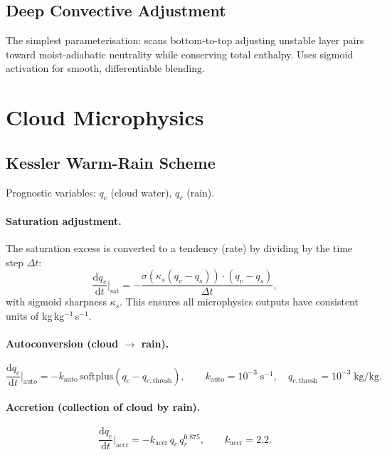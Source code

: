 \documentclass[11pt,twoside]{report}
\newcommand{\dd}{\mathrm{d}}
\begin{document}
\subsection{Deep Convective Adjustment}

The simplest parameterisation: scans bottom-to-top adjusting unstable
layer pairs toward moist-adiabatic neutrality while conserving total
enthalpy.  Uses sigmoid activation for smooth, differentiable blending.


\section{Cloud Microphysics}
\label{sec:microphysics}

\subsection{Kessler Warm-Rain Scheme}

Prognostic variables: $q_c$ (cloud water), $q_r$ (rain).

\paragraph{Saturation adjustment.}
The saturation excess is converted to a tendency (rate) by dividing by the
time step $\Delta t$:
\begin{equation}
  \frac{\dd q_v}{\dd t}\bigg|_{\mathrm{sat}}
  = -\frac{\sigma(\kappa_s(q_v-q_s))\cdot(q_v-q_s)}{\Delta t},
\end{equation}
with sigmoid sharpness $\kappa_s$.  This ensures all microphysics outputs
have consistent units of kg\,kg$^{-1}$\,s$^{-1}$.

\paragraph{Autoconversion (cloud $\to$ rain).}
\begin{equation}
  \frac{\dd q_c}{\dd t}\bigg|_{\mathrm{auto}}
  = -k_{\mathrm{auto}}\,\mathrm{softplus}(q_c - q_{c,\mathrm{thresh}}),
  \qquad k_{\mathrm{auto}}=10^{-3}\;\text{s}^{-1},\quad
  q_{c,\mathrm{thresh}}=10^{-3}\;\text{kg/kg}.
\end{equation}

\paragraph{Accretion (collection of cloud by rain).}
\begin{equation}
  \frac{\dd q_c}{\dd t}\bigg|_{\mathrm{accr}}
  = -k_{\mathrm{accr}}\,q_c\,q_r^{0.875},
  \qquad k_{\mathrm{accr}}=2.2.
\end{equation}
\end{document}
